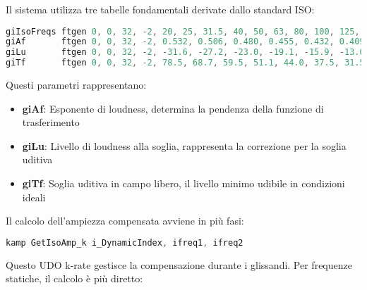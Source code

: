 Il sistema utilizza tre tabelle fondamentali derivate dallo standard ISO:

\begin{lstlisting}[language=C]
giIsoFreqs ftgen 0, 0, 32, -2, 20, 25, 31.5, 40, 50, 63, 80, 100, 125, 160, 200, 250, 315, 400, 500, 630, 800, 1000, 1250, 1600, 2000, 2500, 3150, 4000, 5000, 6300, 8000, 10000, 12500
giAf       ftgen 0, 0, 32, -2, 0.532, 0.506, 0.480, 0.455, 0.432, 0.409, 0.387, 0.367, 0.349, 0.330, 0.315, 0.301, 0.288, 0.276, 0.267, 0.259, 0.253, 0.250, 0.246, 0.244, 0.243, 0.243, 0.243, 0.242, 0.242, 0.245, 0.254, 0.271, 0.301
giLu       ftgen 0, 0, 32, -2, -31.6, -27.2, -23.0, -19.1, -15.9, -13.0, -10.3, -8.1, -6.2, -4.5, -3.1, -2.0, -1.1, -0.4, 0.0, 0.3, 0.5, 0.0, -2.7, -4.1, -1.0, 1.7, 2.5, 1.2, -2.1, -7.1, -11.2, -10.7, -3.1
giTf       ftgen 0, 0, 32, -2, 78.5, 68.7, 59.5, 51.1, 44.0, 37.5, 31.5, 26.5, 22.1, 17.9, 14.4, 11.4, 8.6, 6.2, 4.4, 3.0, 2.2, 2.4, 3.5, 1.7, -1.3, -4.2, -6.0, -5.4, -1.5, 6.0, 12.6, 13.9, 12.3
\end{lstlisting}

Questi parametri rappresentano:
\begin{itemize}
 \item \textbf{giAf}: Esponente di loudness, determina la pendenza della funzione di trasferimento
 \item \textbf{giLu}: Livello di loudness alla soglia, rappresenta la correzione per la soglia uditiva
 \item \textbf{giTf}: Soglia uditiva in campo libero, il livello minimo udibile in condizioni ideali
\end{itemize}

Il calcolo dell'ampiezza compensata avviene in più fasi:

\begin{lstlisting}[language=C]
kamp GetIsoAmp_k i_DynamicIndex, ifreq1, ifreq2
\end{lstlisting}

Questo UDO k-rate gestisce la compensazione durante i glissandi. Per frequenze statiche, il calcolo è più diretto:

